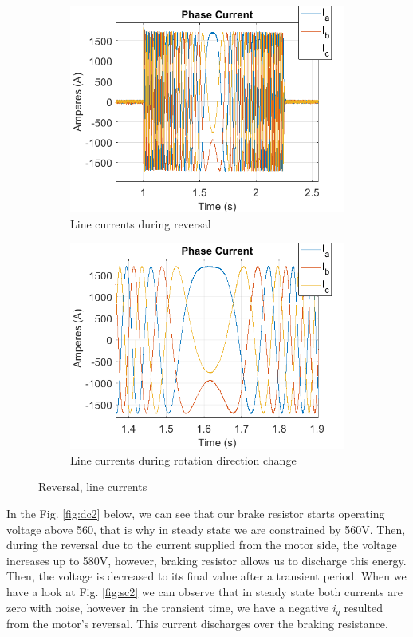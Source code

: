         
\begin{figure}[H]
        \centering
        \begin{subfigure}[b]{0.475\textwidth}
            \centering
            \includegraphics[width = 8 cm]{figs/reverse_sv_phase2.png}
            \caption{Line currents during reversal}
            \label{fig:r1}
        \end{subfigure}
        \hfill
        \begin{subfigure}[b]{0.475\textwidth}  
            \centering 
            \includegraphics[width = 8 cm]{figs/reverse_sv_phase1.png}
            \caption{Line currents during rotation direction change}
            \label{fig:r2}
        \end{subfigure}
        \caption{Reversal, line currents}
        \label{fig:rev_line}
        \end{figure}

In the Fig. \ref{fig:dc2} below, we can see that our brake resistor starts operating voltage above 560, that is why in steady state we are constrained by 560V. Then, during the reversal due to the current supplied from the motor side, the voltage increases up to 580V, however, braking resistor allows us to discharge this energy. Then, the voltage is decreased to its final value after a transient period. When we have a look at Fig. \ref{fig:sc2} we can observe that in steady state both currents are zero with noise, however in the transient time, we have a negative $i_q$ resulted from the motor's reversal. This current discharges over the braking resistance.
        
